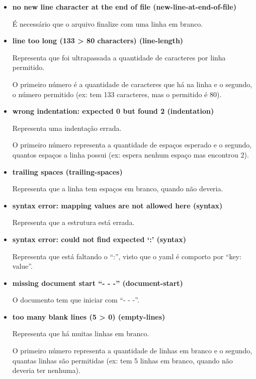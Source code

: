 \begin{apendicesenv}
\begin{itemize}
\item \textbf{no new line character at the end of file  (new-line-at-end-of-file)}

É necessário que o arquivo finalize com uma linha em branco.


\item \textbf{line too long (133 > 80 characters)  (line-length)}

Representa que foi ultrapassada a quantidade de caracteres por linha permitido.

O primeiro número é a quantidade de caracteres que há na linha e o segundo, o número permitido (ex: tem 133 caracteres, mas o permitido é 80).


\item \textbf{wrong indentation: expected 0 but found 2  (indentation)}

Representa uma indentação errada.

O primeiro número representa a quantidade de espaços esperado e o segundo, quantos espaços a linha possui (ex: espera nenhum espaço mas encontrou 2).


\item \textbf{trailing spaces  (trailing-spaces)}

Representa que a linha tem espaços em branco, quando não deveria.


\item \textbf{syntax error: mapping values are not allowed here (syntax)}

Representa que a estrutura está errada.


\item \textbf{syntax error: could not find expected `:' (syntax)}

Representa que está faltando o ``:'', visto que o yaml é comporto por “key: value”.


\item \textbf{missing document start ``- - -''  (document-start)}

O documento tem que iniciar com ``- - -''.


\item \textbf{too many blank lines (5 > 0)  (empty-lines)}

Representa que há muitas linhas em branco.

O primeiro número representa a quantidade de linhas em branco e o segundo, quantas linhas são permitidas (ex: tem 5 linhas em branco, quando não deveria ter nenhuma).
\end{itemize}


\end{apendicesenv}
